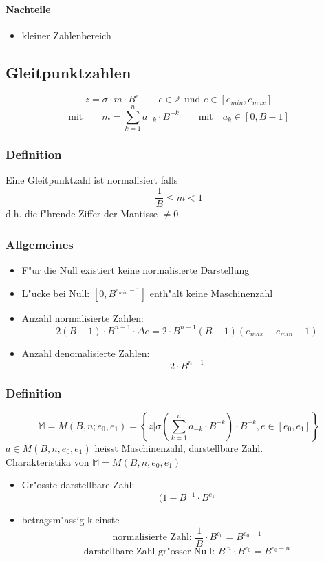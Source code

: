 \paragraph{Nachteile}
\begin{itemize}
	\item kleiner Zahlenbereich
\end{itemize}


\subsection{Gleitpunktzahlen}
\begin{equation}
	z=\sigma\cdot m\cdot B^e\qquad e\in\mathbb{Z}\text{ und } e\in[e_{min},e_{max}]
\end{equation}
\begin{equation*}
	\text{mit}\qquad m=\sum\limits_{k=1}^n a_{-k}\cdot B^{-k}\qquad\text{mit}\quad a_k\in[0,B-1]
\end{equation*}

\subsubsection{Definition}
Eine Gleitpunktzahl ist normalisiert falls $$\frac{1}{B}\leq m < 1$$
d.h. die f"hrende Ziffer der Mantisse $\neq0$

\subsubsection{Allgemeines}
\begin{itemize}
	\item F"ur die Null existiert keine normalisierte Darstellung
	\item L"ucke bei Null: $[0,B^{e_{min}-1}]$ enth"alt keine Maschinenzahl
	\item Anzahl normalisierte Zahlen: $$2(B-1)\cdot B^{n-1}\cdot\Delta e = 2\cdot B^{n-1}(B-1)(e_{max}-e_{min}+1)$$
	\item Anzahl denomalisierte Zahlen: $$2\cdot B^{n-1}$$
\end{itemize}

\subsubsection{Definition}
\begin{equation}
	\mathbb{M}=M(B,n;e_0,e_1)=\left\{z|\sigma\left(\sum\limits_{k=1}^na_{-k}\cdot B^{-k}\right)\cdot B^{-k},e\in[e_0,e_1]\right\}
\end{equation}
\noindent $a\in M(B,n,e_0,e_1)$ heisst Maschinenzahl, darstellbare Zahl. \\
\noindent Charakteristika von $\mathbb{M}=M(B,n,e_0,e_1)$
\begin{itemize}
	\item Gr"osste darstellbare Zahl: $$(1-B^{-1}\cdot B^{e_1}$$
	\item betragsm"assig kleinste $$\text{normalisierte Zahl: }\frac{1}{B}\cdot B^{e_0}=B^{e_0-1}$$ $$\text{darstellbare Zahl gr"osser Null: } B^{.n}\cdot B^{e_0}=B^{e_0-n}$$
\end{itemize}

